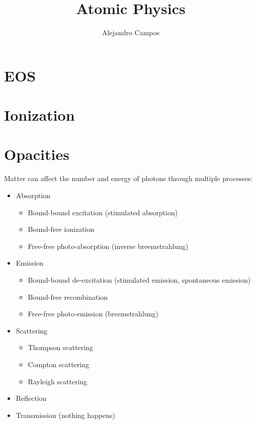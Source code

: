 \documentclass[a4paper,11pt]{report}
\title{Atomic Physics}
\author{Alejandro Campos}
\begin{document}
\maketitle
\tableofcontents

\chapter{EOS}

\chapter{Ionization}

\chapter{Opacities}
Matter can affect the number and energy of photons through multiple processes:
\begin{itemize}
    \item Absorption 
    \begin{itemize}
        \item Bound-bound excitation (stimulated absorption)
        \item Bound-free ionization
        \item Free-free photo-absorption (inverse breemstrahlung)
    \end{itemize}
    \item Emission 
    \begin{itemize}
        \item Bound-bound de-excitation (stimulated emission, spontaneous emission)
        \item Bound-free recombination
        \item Free-free photo-emission (breemstrahlung)
    \end{itemize}
    \item Scattering
    \begin{itemize}
        \item Thompson scattering
        \item Compton scattering
        \item Rayleigh scattering
    \end{itemize}
    \item Reflection
    \item Transmission (nothing happens)
\end{itemize}
\end{document}
